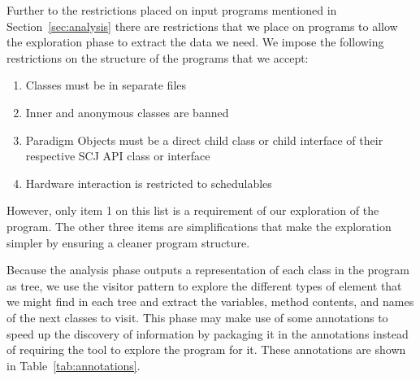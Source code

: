 \documentclass[10pt,a4paper]{article}
\begin{document}
Further to the restrictions placed on input programs mentioned in Section~\ref{sec:analysis} there are restrictions that we place on programs to allow the exploration phase to extract the data we need. We impose the following restrictions on the structure of the programs that we accept:
\begin{enumerate}
\item Classes must be in separate files
\item Inner and anonymous classes are banned
\item Paradigm Objects must be a direct child class or child interface of their respective SCJ API class or interface
\item Hardware interaction is restricted to schedulables %
\end{enumerate}
However, only item 1 on this list is a requirement of our exploration of the program. The other three items are simplifications that make the exploration simpler by ensuring a cleaner program structure.
%
%

Because the analysis phase outputs a representation of each class in the program as tree, we use the visitor pattern to explore the different types of element that we might find in each tree and extract the variables, method contents, and names of the next classes to visit. This phase may make use of some annotations to speed up the discovery of information by packaging it in the annotations instead of requiring the tool to explore the program for it. These annotations are shown in Table~\ref{tab:annotations}.
\end{document}
